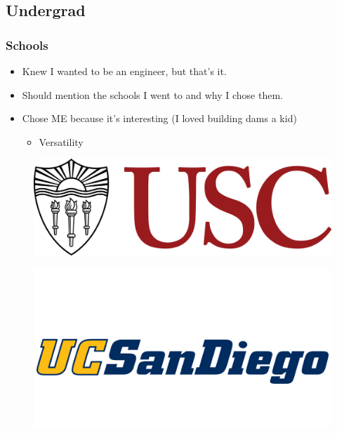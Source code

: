 \documentclass[aspectratio=169]{beamer}
\begin{document}
\subsection{Undergrad}
\begin{frame}
  \frametitle{Schools}
  \begin{itemize}
  \item Knew I wanted to be an engineer, but that's it.
  \item Should mention the schools I went to and why I chose them.
  \item Chose ME because it's interesting (I loved building dams a
    kid)
    \begin{itemize}
      \item Versatility
    \end{itemize}
  \end{itemize}

  \begin{figure}
    \includegraphics[width=0.35\linewidth]{USC_Logo.png}
  \end{figure}

  \begin{figure}
    \includegraphics[width=0.35\linewidth]{ucsd-athletics-logo.png}
  \end{figure}
\end{frame}
\end{document}
